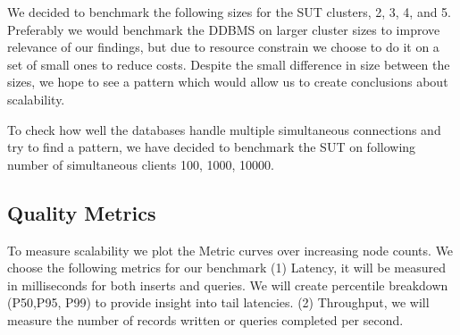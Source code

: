 We decided to benchmark the following sizes for the SUT clusters, 2, 3, 4, and 5.
Preferably we would benchmark the DDBMS on larger cluster sizes to improve relevance of our findings, but due to resource constrain we choose to do it on a set of small ones to reduce costs.
Despite the small difference in size between the sizes, we hope to see a pattern which would allow us to create conclusions about scalability.

To check how well the databases handle multiple simultaneous connections and try to find a pattern, we have decided to benchmark the SUT on following number of simultaneous clients 100, 1000, 10000.

%
%
%
\subsection{Quality Metrics}
To measure scalability we plot the Metric curves over increasing node counts.
We choose the following metrics for our benchmark
(1) Latency, it will be measured in milliseconds for both inserts and queries. We will create percentile breakdown (P50,P95, P99) to provide insight into tail latencies.
(2) Throughput, we will measure the number of records written or queries completed per second.

